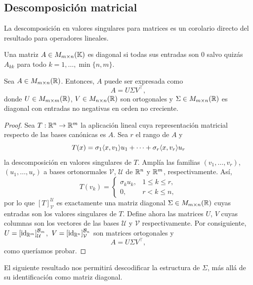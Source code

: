 \subsection{Descomposición matricial}
La descomposición en valores singulares para matrices es un corolario directo del resultado para operadores lineales.

\begin{definition}
	Una matriz $A \in M_{m\times n}(\mathbb{K})$ es diagonal si todas sus entradas son $0$ salvo quizás $A_{kk}$ para todo $k=1,\dots,\min\{n,m\}$.
\end{definition}

\begin{proposition}
	Sea $A\in M_{m\times n}(\mathbb{R})$. Entonces, $A$ puede ser expresada como
	\[
		A=U\Sigma V^{\top},
	\]
	donde $U\in M_{m\times m}(\mathbb{R})$, $V\in M_{n\times n}(\mathbb{R})$ son ortogonales y $\Sigma \in M_{m\times n}(\mathbb{R})$ es diagonal con entradas no negativas en orden no creciente.
\end{proposition}

\begin{proof}
	Sea $T:\mathbb{R}^n \rightarrow \mathbb{R}^m$ la aplicación lineal cuya representación matricial respecto de las bases canónicas es $A$. Sea $r$ el rango de $A$ y
	\[
		T(x)=\sigma_1\langle x,v_1\rangle u_1 + \dots + \sigma_r \langle x, v_r\rangle u_r
	\]
	la descomposición en valores singulares de $T$. Amplía las familias  $(v_1,\dots,v_r)$, $(u_1,\dots,u_r)$ a bases ortonormales $\mathcal{V}$, $\mathcal{U}$ de $\mathbb{R}^n$ y $\mathbb{R}^m$, respectivamente. Así,
	\[
		T(v_k)=
		\begin{cases}
			\sigma_k u_k, & 1\leq k\leq r, \\
			0,            & r<k\leq n,
		\end{cases}
	\]
	por lo que $[T]_{\mathcal{V}}^{\mathcal{U}}$ es exactamente una matriz diagonal $\Sigma \in M_{m\times n}(\mathbb{R})$ cuyas entradas son los valores singulares de $T$. Define ahora las matrices $U$, $V$ cuyas columnas son los vectores de las bases $\mathcal{U}$ y $\mathcal{V}$ respectivamente. Por consiguiente, $U=[\operatorname{id}_{\mathbb{R}^m}]_{\mathcal{U}}^{\mathcal{B}_m}$,\, $V=[\operatorname{id}_{\mathbb{R}^n}]_{\mathcal{V}}^{\mathcal{B}_n}$ son matrices ortogonales y
	\[
		A=U\Sigma V^{\top},
	\]
	como queríamos probar.
\end{proof}

El siguiente resultado nos permitirá descodificar la estructura de $\Sigma$, más allá de su identificación como matriz diagonal.

